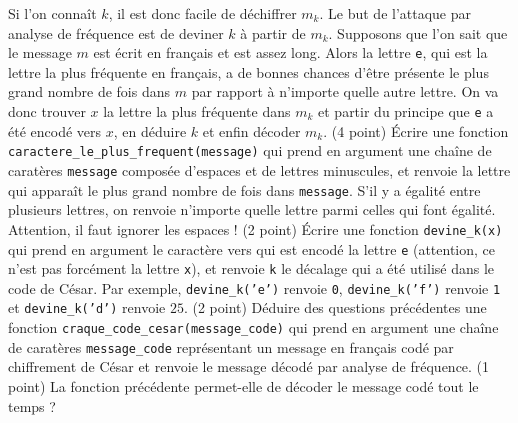 Si l'on connaît $ k $, il est donc facile de déchiffrer $ m_k $. Le but de l'attaque par analyse de fréquence est de deviner $ k $ à partir de $ m_k $. Supposons que l'on sait que le message $ m $ est écrit en français et est assez long. Alors la lettre \texttt{e}, qui est la lettre la plus fréquente en français, a de bonnes chances d'être présente le plus grand nombre de fois dans $ m $ par rapport à n'importe quelle autre lettre. On va donc trouver $ x $ la lettre la plus fréquente dans $ m_k $ et partir du principe que \texttt{e} a été encodé vers $ x $, en déduire $ k $ et enfin décoder $ m_k $.
\quessques (4 point) Écrire une fonction \texttt{caractere_le_plus_frequent(message)} qui prend en argument une chaîne de caratères \texttt{message} composée d'espaces et de lettres minuscules, et renvoie la lettre qui apparaît le plus grand nombre de fois dans \texttt{message}. S'il y a égalité entre plusieurs lettres, on renvoie n'importe quelle lettre parmi celles qui font égalité. Attention, il faut ignorer les espaces !
\ssques (2 point) Écrire une fonction \texttt{devine_k(x)} qui prend en argument le caractère vers qui est encodé la lettre \texttt{e} (attention, ce n'est pas forcément la lettre \texttt{x}), et renvoie \texttt{k} le décalage qui a été utilisé dans le code de César. Par exemple, \texttt{devine_k('e')} renvoie \texttt{0}, \texttt{devine_k('f')} renvoie \texttt{1} et \texttt{devine_k('d')} renvoie $ 25 $.
\quessques (2 point) Déduire des questions précédentes une fonction \texttt{craque_code_cesar(message_code)} qui prend en argument une chaîne de caratères \texttt{message\_code} représentant un message en français codé par chiffrement de César et renvoie le message décodé par analyse de fréquence.
\ssques (1 point) La fonction précédente permet-elle de décoder le message codé tout le temps ?

